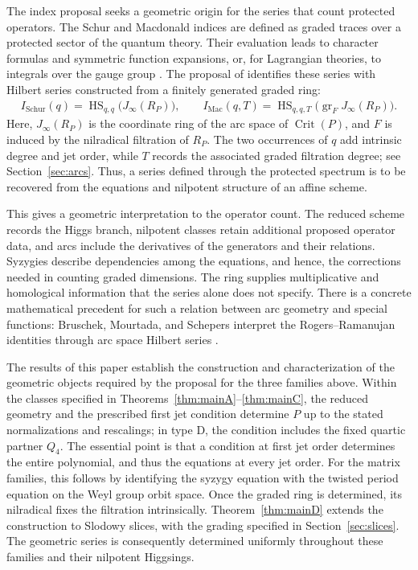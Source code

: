\documentclass[10pt,reqno]{amsart}
\numberwithin{equation}{section}
\theoremstyle{plain}
\theoremstyle{definition}
\DeclareMathOperator{\Crit}{Crit}
\DeclareMathOperator{\gr}{gr}
\DeclareMathOperator{\HS}{HS}
\newcommand{\Mac}{\mathrm{Mac}}
\begin{document}
The index proposal seeks a geometric origin for the series that count protected operators. The Schur and Macdonald indices are defined as graded traces over a protected sector of the quantum theory. Their evaluation leads to character formulas and symmetric function expansions, or, for Lagrangian theories, to integrals over the gauge group \cite{Kinney:2005ej,Gadde:2011uv}. The proposal of \cite{Kang:2025zub,Kang:2026nge,KLSnonpoint,Kang:2026ney,SUPERPOINT} identifies these series with Hilbert series constructed from a finitely generated graded ring:
\begin{align}
	I_{\mathrm{Schur}}(q)=\HS_{q,q}\big(J_\infty(R_P)\big),\qquad I_{\Mac}(q,T)=\HS_{q,q,T}\big(\gr_FJ_\infty(R_P)\big).
\end{align}
Here, $J_\infty(R_P)$ is the coordinate ring of the arc space of $\Crit(P)$, and $F$ is induced by the nilradical filtration of $R_P$. The two occurrences of $q$ add intrinsic degree and jet order, while $T$ records the associated graded filtration degree; see Section~\ref{sec:arcs}. Thus, a series defined through the protected spectrum is to be recovered from the equations and nilpotent structure of an affine scheme.

This gives a geometric interpretation to the operator count. The reduced scheme records the Higgs branch, nilpotent classes retain additional proposed operator data, and arcs include the derivatives of the generators and their relations. Syzygies describe dependencies among the equations, and hence, the corrections needed in counting graded dimensions. The ring supplies multiplicative and homological information that the series alone does not specify. There is a concrete mathematical precedent for such a relation between arc geometry and special functions: Bruschek, Mourtada, and Schepers interpret the Rogers--Ramanujan identities through arc space Hilbert series \cite{BMS}.

The results of this paper establish the construction and characterization of the geometric objects required by the proposal for the three families above. Within the classes specified in Theorems~\ref{thm:mainA}--\ref{thm:mainC}, the reduced geometry and the prescribed first jet condition determine $P$ up to the stated normalizations and rescalings; in type D, the condition includes the fixed quartic partner $Q_4$. The essential point is that a condition at first jet order determines the entire polynomial, and thus the equations at every jet order. For the matrix families, this follows by identifying the syzygy equation with the twisted period equation on the Weyl group orbit space. Once the graded ring is determined, its nilradical fixes the filtration intrinsically. Theorem~\ref{thm:mainD} extends the construction to Slodowy slices, with the grading specified in Section~\ref{sec:slices}. The geometric series is consequently determined uniformly throughout these families and their nilpotent Higgsings.
\end{document}

